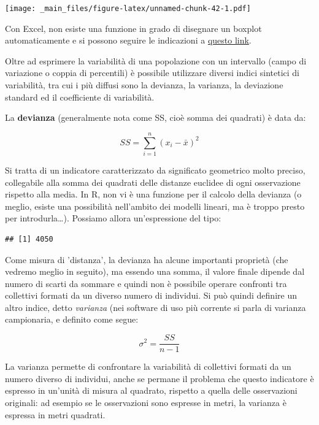 \documentclass[a4paper,12pt,oneside]{book}
\newenvironment{Shaded}{\begin{snugshade}}{\end{snugshade}}
\newcommand{\KeywordTok}[1]{\textcolor[rgb]{0.13,0.29,0.53}{\textbf{#1}}}
\newcommand{\DecValTok}[1]{\textcolor[rgb]{0.00,0.00,0.81}{#1}}
\newcommand{\StringTok}[1]{\textcolor[rgb]{0.31,0.60,0.02}{#1}}
\newcommand{\OperatorTok}[1]{\textcolor[rgb]{0.81,0.36,0.00}{\textbf{#1}}}
\newcommand{\NormalTok}[1]{#1}
\begin{document}
\texttt{[image: \_main\_files/figure-latex/unnamed-chunk-42-1.pdf]}

Con Excel, non esiste una funzione in grado di disegnare un boxplot
automaticamente e si possono seguire le indicazioni a
\href{http://www.dummies.com/how-to/content/boxandwhisker-charts-for-excel.html}{questo
link}.

Oltre ad esprimere la variabilità di una popolazione con un intervallo
(campo di variazione o coppia di percentili) è possibile utilizzare
diversi indici sintetici di variabilità, tra cui i più diffusi sono la
devianza, la varianza, la deviazione standard ed il coefficiente di
variabilità.

La \textbf{devianza} (generalmente nota come SS, cioè somma dei
quadrati) è data da:

\[SS = \sum\limits_{i = 1}^n {(x_i  - \bar x)^2 }\]

Si tratta di un indicatore caratterizzato da significato geometrico
molto preciso, collegabile alla somma dei quadrati delle distanze
euclidee di ogni osservazione rispetto alla media. In R, non vi è una
funzione per il calcolo della devianza (o meglio, esiste una possibilità
nell'ambito dei modelli lineari, ma è troppo presto per
introdurla\ldots{}). Possiamo allora un'espressione del tipo:

\begin{Shaded}
\end{Shaded}

\begin{verbatim}
## [1] 4050
\end{verbatim}

Come misura di 'distanza', la devianza ha alcune importanti proprietà
(che vedremo meglio in seguito), ma essendo una somma, il valore finale
dipende dal numero di scarti da sommare e quindi non è possibile operare
confronti tra collettivi formati da un diverso numero di individui. Si
può quindi definire un altro indice, detto \emph{varianza} (nei software
di uso più corrente si parla di varianza campionaria, e definito come
segue:

\[\sigma^2  = \frac{SS}{n - 1}\]

La varianza permette di confrontare la variabilità di collettivi formati
da un numero diverso di individui, anche se permane il problema che
questo indicatore è espresso in un'unità di misura al quadrato, rispetto
a quella delle osservazioni originali: ad esempio se le osservazioni
sono espresse in metri, la varianza è espressa in metri quadrati.
\end{document}
